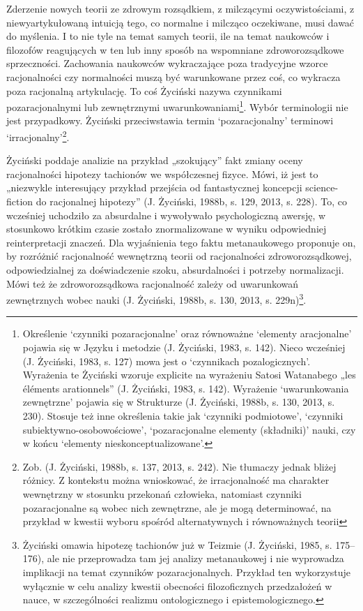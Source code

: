 \documentclass{article}
\begin{document}
Zderzenie nowych teorii ze zdrowym rozsądkiem, z milczącymi oczywistościami, z niewyartykułowaną intuicją tego, co
normalne i milcząco oczekiwane, musi dawać do myślenia. I to nie tyle na temat samych teorii, ile na temat naukowców i
filozofów reagujących w ten lub inny sposób na wspomniane zdroworozsądkowe sprzeczności. Zachowania naukowców
wykraczające poza tradycyjne wzorce racjonalności czy normalności muszą być warunkowane przez coś, co wykracza poza
racjonalną artykulację. To coś Życiński nazywa czynnikami pozaracjonalnymi lub zewnętrznymi
uwarunkowaniami\footnote{Określenie ‘czynniki pozaracjonalne’ oraz równoważne ‘elementy aracjonalne’ pojawia się w
Języku i metodzie \label{ref:RNDQuqexwGAtV}(J. Życiński, 1983, s. 142). Nieco wcześniej \label{ref:RND8JMQ2LGnoG}(J.
Życiński, 1983, s. 127) mowa jest o ‘czynnikach pozalogicznych’. Wyrażenia te Życiński wzoruje explicite na wyrażeniu
Satosi Watanabego „les éléments arationnels” \label{ref:RNDDibcJHr6Ng}(J. Życiński, 1983, s. 142). Wyrażenie
‘uwarunkowania zewnętrzne’ pojawia się w Strukturze \label{ref:RNDmQCXMWkgmK}(J. Życiński, 1988b, s. 130, 2013, s.
230). Stosuje też inne określenia takie jak ‘czynniki podmiotowe’, ‘czynniki subiektywno-osobowościowe’,
‘pozaracjonalne elementy (składniki)’ nauki, czy w końcu ‘elementy nieskonceptualizowane’.}. Wybór terminologii nie
jest przypadkowy. Życiński przeciwstawia termin ‘pozaracjonalny’ terminowi ‘irracjonalny’\footnote{Zob.
\label{ref:RND4GDp5Hkb8p}(J. Życiński, 1988b, s. 137, 2013, s. 242). Nie tłumaczy jednak bliżej różnicy. Z kontekstu
można wnioskować, że irracjonalność ma charakter wewnętrzny w stosunku przekonań człowieka, natomiast czynniki
pozaracjonalne są wobec nich zewnętrzne, ale je mogą determinować, na przykład w kwestii wyboru spośród alternatywnych
i równoważnych teorii}.

Życiński poddaje analizie na przykład „szokujący” fakt zmiany oceny racjonalności hipotezy tachionów we współczesnej
fizyce. Mówi, iż jest to „niezwykle interesujący przykład przejścia od fantastycznej koncepcji science-fiction do
racjonalnej hipotezy” \label{ref:RNDOVbNCXy3az}(J. Życiński, 1988b, s. 129, 2013, s. 228). To, co wcześniej uchodziło
za absurdalne i wywoływało psychologiczną awersję, w stosunkowo krótkim czasie zostało znormalizowane w wyniku
odpowiedniej reinterpretacji znaczeń. Dla wyjaśnienia tego faktu metanaukowego proponuje on, by rozróżnić racjonalność
wewnętrzną teorii od racjonalności zdroworozsądkowej, odpowiedzialnej za doświadczenie szoku, absurdalności i potrzeby
normalizacji. Mówi też że zdroworozsądkowa racjonalność zależy od uwarunkowań zewnętrznych wobec nauki
\label{ref:RNDDERgYAAw4H}(J. Życiński, 1988b, s. 130, 2013, s. 229n)\footnote{Życiński omawia hipotezę tachionów już w
Teizmie \label{ref:RNDGRaNeNBaa8}(J. Życiński, 1985, s. 175–176), ale nie przeprowadza tam jej analizy metanaukowej i
nie wyprowadza implikacji na temat czynników pozaracjonalnych. Przykład ten wykorzystuje wyłącznie w celu analizy
kwestii obecności filozoficznych przedzałożeń w nauce, w szczególności realizmu ontologicznego i epistemologicznego.}.
\end{document}
